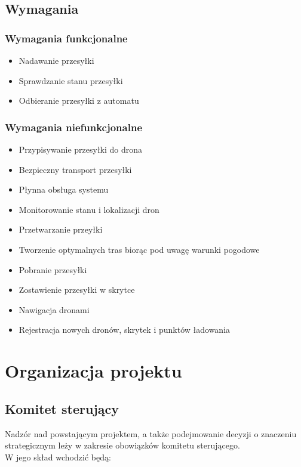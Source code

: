 \documentclass[12pt]{article}
\begin{document}
\subsection{Wymagania}
\subsubsection{Wymagania funkcjonalne}
\begin{itemize}
\item Nadawanie przesyłki
\item Sprawdzanie stanu przesyłki
\item Odbieranie przesyłki z automatu
\end{itemize}
\subsubsection{Wymagania niefunkcjonalne}
\begin{itemize}
\item Przypisywanie przesyłki do drona
\item Bezpieczny transport przesyłki
\item Płynna obsługa systemu
\item Monitorowanie stanu i lokalizacji dron
\item Przetwarzanie przeyłki
\item Tworzenie optymalnych tras biorąc pod uwagę warunki pogodowe
\item Pobranie przesyłki
\item Zostawienie przesyłki w skrytce
\item Nawigacja dronami
\item Rejestracja nowych dronów, skrytek i punktów ładowania
\end{itemize}

\newpage
\section{Organizacja projektu}
\subsection{Komitet sterujący}
Nadzór nad powstającym projektem, a także podejmowanie decyzji o znaczeniu strategicznym leży w zakresie obowiązków komitetu sterującego.\\
W jego skład wchodzić będą:\\
\end{document}
